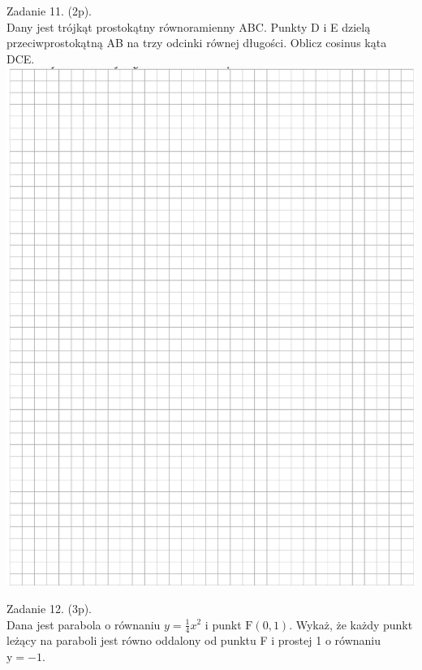 \documentclass[10pt]{article}
\begin{document}
Zadanie 11. (2p).\\
Dany jest trójkąt prostokątny równoramienny ABC. Punkty D i E dzielą przeciwprostokątną AB na trzy odcinki równej długości. Oblicz cosinus kąta DCE.\\
\includegraphics[max width=\textwidth, center]{2024_11_21_498389c978c770348ebcg-09}

Zadanie 12. (3p).\\
Dana jest parabola o równaniu \(y=\frac{1}{4} x^{2}\) i punkt \(\mathrm{F}(0,1)\). Wykaż, że każdy punkt leżący na paraboli jest równo oddalony od punktu F i prostej 1 o równaniu \(\mathrm{y}=-1\).
\end{document}
